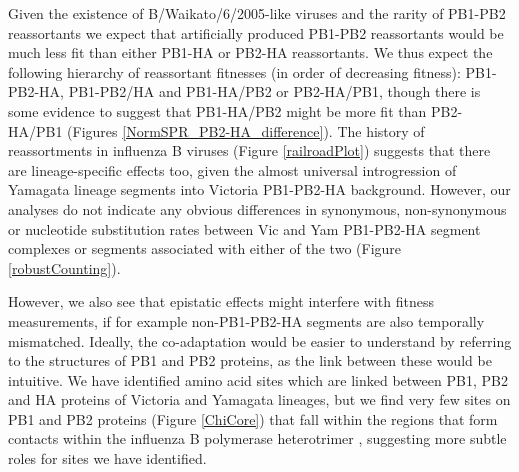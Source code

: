 \documentclass[11pt,oneside,letterpaper]{article}
\begin{document}
Given the existence of B/Waikato/6/2005-like viruses and the rarity of PB1-PB2 reassortants we expect that artificially produced PB1-PB2 reassortants would be much less fit than either PB1-HA or PB2-HA reassortants.
We thus expect the following hierarchy of reassortant fitnesses (in order of decreasing fitness): PB1-PB2-HA, PB1-PB2/HA and PB1-HA/PB2 or PB2-HA/PB1, though there is some evidence to suggest that PB1-HA/PB2 might be more fit than PB2-HA/PB1 (Figures \ref{NormSPR_PB2-HA_difference}).
The history of reassortments in influenza B viruses (Figure \ref{railroadPlot}) suggests that there are lineage-specific effects too, given the almost universal introgression of Yamagata lineage segments into Victoria PB1-PB2-HA background.
However, our analyses do not indicate any obvious differences in synonymous, non-synonymous or nucleotide substitution rates between Vic and Yam PB1-PB2-HA segment complexes or segments associated with either of the two (Figure \ref{robustCounting}).

However, we also see that epistatic effects might interfere with fitness measurements, if for example non-PB1-PB2-HA segments are also temporally mismatched.
Ideally, the co-adaptation would be easier to understand by referring to the structures of PB1 and PB2 proteins, as the link between these would be intuitive.
We have identified amino acid sites which are linked between PB1, PB2 and HA proteins of Victoria and Yamagata lineages, but we find very few sites on PB1 and PB2 proteins (Figure \ref{ChiCore}) that fall within the regions that form contacts within the influenza B polymerase heterotrimer \citep{sugiyama2009}, suggesting more subtle roles for sites we have identified.
\end{document}
